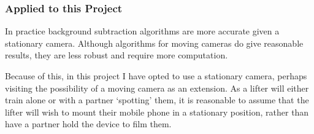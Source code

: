 \subsubsection{Applied to this Project}

In practice background subtraction algorithms are more accurate given a stationary camera. Although algorithms for moving cameras do give reasonable results, they are less robust and require more computation.

Because of this, in this project I have opted to use a stationary camera, perhaps visiting the possibility of a moving camera as an extension. As a lifter will either train alone or with a partner `spotting' them, it is reasonable to assume that the lifter will wish to mount their mobile phone in a stationary position, rather than have a partner hold the device to film them.